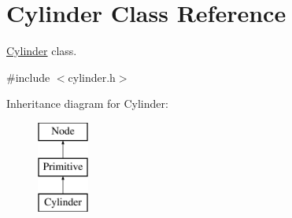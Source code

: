 \hypertarget{class_cylinder}{
\section{\-Cylinder \-Class \-Reference}
\label{class_cylinder}
}


\hyperlink{class_cylinder}{\-Cylinder} class.  




{\ttfamily \#include $<$cylinder.\-h$>$}

\-Inheritance diagram for \-Cylinder\-:\begin{figure}[H]
\begin{center}
\leavevmode
\includegraphics[height=3.000000cm]{class_cylinder}
\end{center}
\end{figure}
